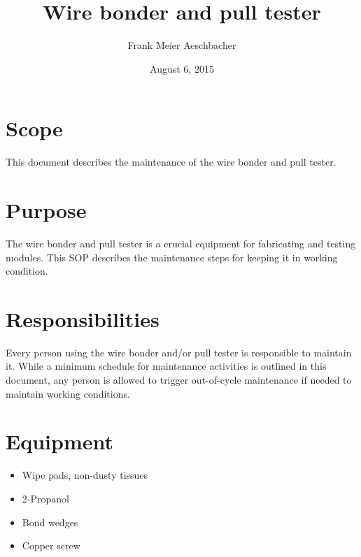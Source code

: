 \documentclass[12pt]{unlsilabsop}
\title{Wire bonder and pull tester}
\date{August 6, 2015}
\author{Frank Meier Aeschbacher}
\begin{document}
\maketitle

\section{Scope}
This document describes the maintenance of the wire bonder and pull tester.

\section{Purpose}
The wire bonder and pull tester is a crucial equipment for fabricating and testing modules. This SOP describes the maintenance steps for keeping it in working condition.


\section{Responsibilities}
Every person using the wire bonder and/or pull tester is responsible to maintain it. While a minimum schedule for maintenance activities is outlined in this document, any person is allowed to trigger out-of-cycle maintenance if needed to maintain working conditions.

\section{Equipment}

\begin{itemize}
    \item Wipe pads, non-dusty tissues
    \item 2-Propanol
    \item Bond wedges
    \item Copper screw
\end{itemize}

\end{document}
